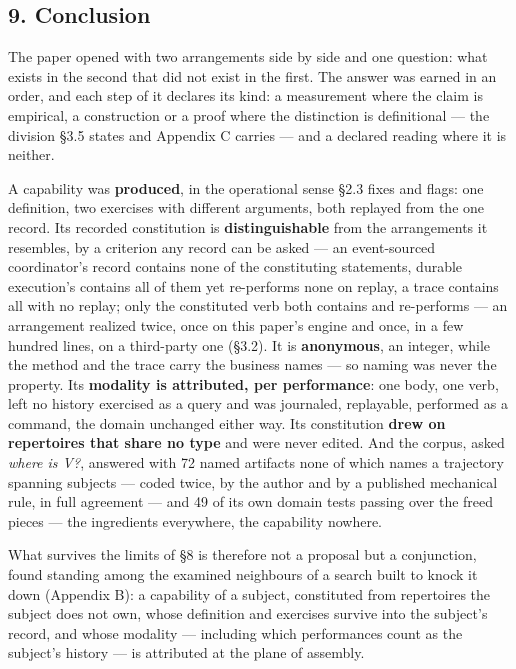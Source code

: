 \documentclass[
]{article}
\newcounter{none} %
\begin{document}
\subsection{9. Conclusion}\label{conclusion}

The paper opened with two arrangements side by side and one question:
what exists in the second that did not exist in the first. The answer
was earned in an order, and each step of it declares its kind: a
measurement where the claim is empirical, a construction or a proof
where the distinction is definitional --- the division §3.5 states and
Appendix C carries --- and a declared reading where it is neither.

A capability was \textbf{produced}, in the operational sense §2.3 fixes
and flags: one definition, two exercises with different arguments, both
replayed from the one record. Its recorded constitution is
\textbf{distinguishable} from the arrangements it resembles, by a
criterion any record can be asked --- an event-sourced coordinator's
record contains none of the constituting statements, durable execution's
contains all of them yet re-performs none on replay, a trace contains
all with no replay; only the constituted verb both contains and
re-performs --- an arrangement realized twice, once on this paper's
engine and once, in a few hundred lines, on a third-party one (§3.2). It
is \textbf{anonymous}, an integer, while the method and the trace carry
the business names --- so naming was never the property. Its
\textbf{modality is attributed, per performance}: one body, one verb,
left no history exercised as a query and was journaled, replayable,
performed as a command, the domain unchanged either way. Its
constitution \textbf{drew on repertoires that share no type} and were
never edited. And the corpus, asked \emph{where is V?}, answered with 72
named artifacts none of which names a trajectory spanning subjects ---
coded twice, by the author and by a published mechanical rule, in full
agreement --- and 49 of its own domain tests passing over the freed
pieces --- the ingredients everywhere, the capability nowhere.

What survives the limits of §8 is therefore not a proposal but a
conjunction, found standing among the examined neighbours of a search
built to knock it down (Appendix B): a capability of a subject,
constituted from repertoires the subject does not own, whose definition
and exercises survive into the subject's record, and whose modality ---
including which performances count as the subject's history --- is
attributed at the plane of assembly.
\end{document}
